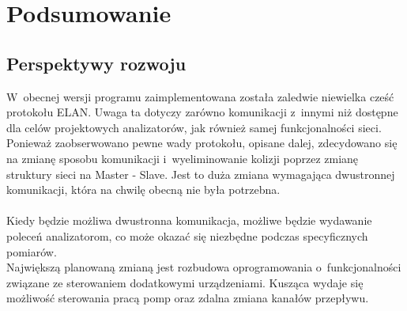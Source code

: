 \section{Podsumowanie}
\subsection{Perspektywy rozwoju}
W~obecnej wersji programu zaimplementowana została zaledwie niewielka cześć protokołu ELAN. Uwaga ta dotyczy zarówno komunikacji z~innymi niż dostępne dla celów projektowych analizatorów, jak również samej funkcjonalności sieci. Ponieważ zaobserwowano pewne wady protokołu, opisane dalej, zdecydowano się na zmianę sposobu komunikacji i~wyeliminowanie kolizji poprzez zmianę struktury sieci na Master - Slave. Jest to duża zmiana wymagająca dwustronnej komunikacji, która na chwilę obecną nie była potrzebna. \\ 
\\
Kiedy będzie możliwa dwustronna komunikacja, możliwe będzie wydawanie poleceń analizatorom, co może okazać się niezbędne podczas specyficznych pomiarów. \\
Największą planowaną zmianą jest rozbudowa oprogramowania o~funkcjonalności związane ze sterowaniem dodatkowymi urządzeniami. Kusząca wydaje się możliwość sterowania pracą pomp oraz zdalna zmiana kanałów przepływu.

